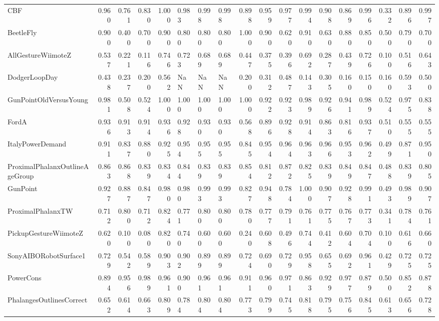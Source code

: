 \begin{tabular}{lrrrrlllrrrrrrrrrr}
CBF & 0.960 & 0.761 & 0.830 & 1.000 & 0.983 & 0.998 & 0.998 & 0.898 & 0.959 & 0.977 & 0.994 & 0.908 & 0.869 & 0.996 & 0.332 & 0.896 & 0.997 \\
BeetleFly & 0.900 & 0.400 & 0.700 & 0.900 & 0.800 & 0.800 & 0.800 & 1.000 & 0.900 & 0.620 & 0.910 & 0.630 & 0.880 & 0.850 & 0.500 & 0.790 & 0.700 \\
AllGestureWiimoteZ & 0.537 & 0.221 & 0.116 & 0.746 & 0.723 & 0.689 & 0.689 & 0.447 & 0.375 & 0.396 & 0.692 & 0.287 & 0.439 & 0.726 & 0.100 & 0.516 & 0.643 \\
DodgerLoopDay & 0.438 & 0.237 & 0.200 & 0.562 & NaN & NaN & NaN & 0.200 & 0.312 & 0.487 & 0.143 & 0.305 & 0.160 & 0.150 & 0.160 & 0.593 & 0.500 \\
GunPointOldVersusYoung & 0.981 & 0.508 & 0.524 & 1.000 & 1.000 & 1.000 & 1.000 & 1.000 & 0.922 & 0.923 & 0.989 & 0.926 & 0.941 & 0.989 & 0.524 & 0.975 & 0.838 \\
FordA & 0.936 & 0.913 & 0.914 & 0.936 & 0.928 & 0.930 & 0.930 & 0.568 & 0.896 & 0.928 & 0.914 & 0.863 & 0.816 & 0.937 & 0.510 & 0.555 & 0.555 \\
ItalyPowerDemand & 0.911 & 0.837 & 0.880 & 0.925 & 0.954 & 0.955 & 0.955 & 0.845 & 0.954 & 0.964 & 0.963 & 0.966 & 0.953 & 0.962 & 0.499 & 0.871 & 0.950 \\
ProximalPhalanxOutlineAgeGroup & 0.863 & 0.868 & 0.839 & 0.834 & 0.844 & 0.839 & 0.839 & 0.854 & 0.812 & 0.872 & 0.825 & 0.839 & 0.849 & 0.847 & 0.488 & 0.839 & 0.805 \\
GunPoint & 0.927 & 0.887 & 0.847 & 0.980 & 0.980 & 0.993 & 0.993 & 0.827 & 0.948 & 0.784 & 1.000 & 0.907 & 0.928 & 0.991 & 0.493 & 0.989 & 0.907 \\
ProximalPhalanxTW & 0.712 & 0.800 & 0.712 & 0.824 & 0.771 & 0.800 & 0.800 & 0.780 & 0.777 & 0.791 & 0.761 & 0.775 & 0.767 & 0.773 & 0.341 & 0.784 & 0.761 \\
PickupGestureWiimoteZ & 0.620 & 0.100 & 0.080 & 0.820 & 0.740 & 0.600 & 0.600 & 0.240 & 0.608 & 0.496 & 0.744 & 0.412 & 0.604 & 0.704 & 0.100 & 0.616 & 0.660 \\
SonyAIBORobotSurface1 & 0.729 & 0.542 & 0.589 & 0.903 & 0.902 & 0.899 & 0.899 & 0.724 & 0.690 & 0.729 & 0.958 & 0.655 & 0.692 & 0.961 & 0.429 & 0.725 & 0.725 \\
PowerCons & 0.894 & 0.956 & 0.989 & 0.961 & 0.900 & 0.961 & 0.961 & 0.911 & 0.960 & 0.971 & 0.863 & 0.929 & 0.977 & 0.879 & 0.500 & 0.852 & 0.878 \\
PhalangesOutlinesCorrect & 0.652 & 0.614 & 0.663 & 0.809 & 0.784 & 0.804 & 0.804 & 0.773 & 0.799 & 0.745 & 0.818 & 0.795 & 0.756 & 0.845 & 0.613 & 0.656 & 0.728 \\

\end{tabular}
